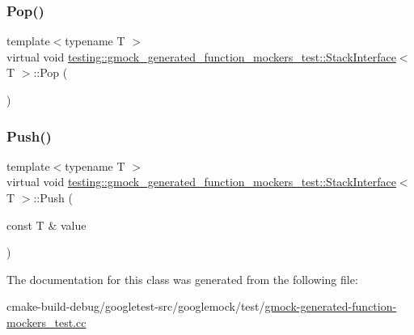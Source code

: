 \subsubsection{\texorpdfstring{Pop()}{Pop()}}
{\footnotesize\ttfamily template$<$typename T $>$ \\
virtual void \mbox{\hyperlink{classtesting_1_1gmock__generated__function__mockers__test_1_1StackInterface}{testing\+::gmock\+\_\+generated\+\_\+function\+\_\+mockers\+\_\+test\+::\+Stack\+Interface}}$<$ T $>$\+::Pop (\begin{DoxyParamCaption}{ }\end{DoxyParamCaption})\hspace{0.3cm}{\ttfamily [pure virtual]}}

\mbox{\label{classtesting_1_1gmock__generated__function__mockers__test_1_1StackInterface_a49448f6195021fee947d37b80b6e5d30}} 
\subsubsection{\texorpdfstring{Push()}{Push()}}
{\footnotesize\ttfamily template$<$typename T $>$ \\
virtual void \mbox{\hyperlink{classtesting_1_1gmock__generated__function__mockers__test_1_1StackInterface}{testing\+::gmock\+\_\+generated\+\_\+function\+\_\+mockers\+\_\+test\+::\+Stack\+Interface}}$<$ T $>$\+::Push (\begin{DoxyParamCaption}\item[{const T \&}]{value }\end{DoxyParamCaption})\hspace{0.3cm}{\ttfamily [pure virtual]}}



The documentation for this class was generated from the following file\+:\begin{DoxyCompactItemize}
\item 
cmake-\/build-\/debug/googletest-\/src/googlemock/test/\mbox{\hyperlink{gmock-generated-function-mockers__test_8cc}{gmock-\/generated-\/function-\/mockers\+\_\+test.\+cc}}\end{DoxyCompactItemize}
